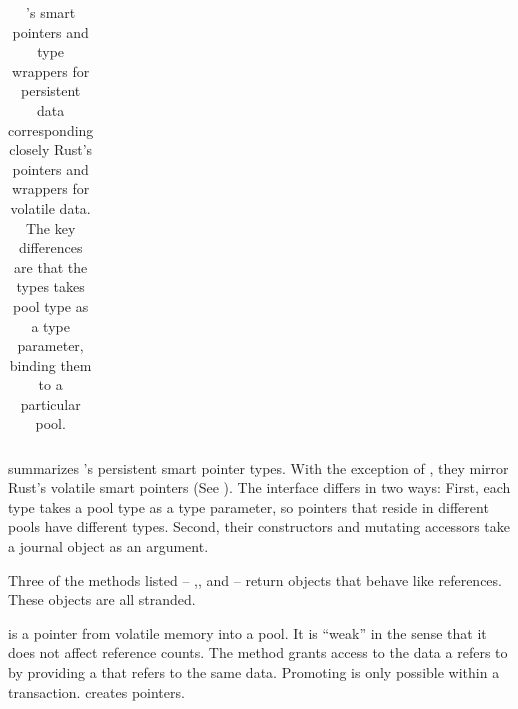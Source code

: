 \begin{table}
{ \centering
  \footnotesize
  \begin{tabular}{|l|l|p{4in}|}\hline
    
  \end{tabular}}
  \caption{\This{}'s smart pointers and type wrappers for persistent data
    corresponding closely Rust's pointers and wrappers for volatile data.  The
    key differences are that the \this{} types takes pool type as a type
    parameter, binding them to a particular pool.}
  \label{tab:types}
\end{table}


 summarizes \this{}'s persistent smart pointer types.  With
the exception of , they mirror Rust's volatile smart pointers (See
).  The interface differs in two ways: First, each type
takes a pool type as a type parameter, so pointers that reside in different
pools have different types.  Second, their constructors and mutating accessors
take a journal object as an argument.

Three of the methods listed --
,\linebreak{}, and
 -- return objects that behave like references.  These
objects are all stranded. %

 is a pointer from volatile memory into a pool.  It is ``weak'' in
the sense that it does not affect reference counts.  The  method
grants access to the data a  refers to by providing a 
that refers to the same data.  Promoting is only possible within a transaction.
 creates  pointers.

